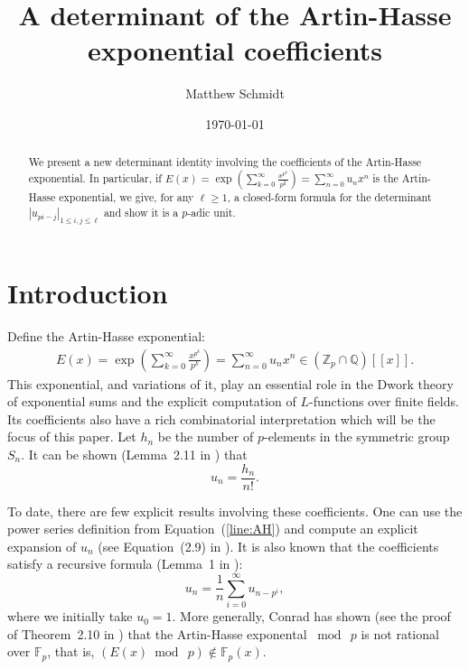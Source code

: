 \documentclass[letterpaper,oneside, 10pt]{amsart}
\theoremstyle{definition}
\numberwithin{equation}{section}
\newcommand{\Fp}{\mathbb{F}_p}
\newcommand{\Zp}{\mathbb{Z}_p}
\begin{document}
\date{\today}
\title{A determinant of the Artin-Hasse exponential coefficients}
\author{Matthew Schmidt}

\begin{abstract}
We present a new determinant identity involving the coefficients of the Artin-Hasse exponential. In particular, if $E(x) = \exp(\sum_{k=0}^\infty \frac{x^{p^k}}{p^k}) = \sum_{n=0}^\infty u_nx^n$ is the Artin-Hasse exponential, we give, for any $\ell\geq 1$, a closed-form formula for the determinant $|u_{pi-j}|_{1\leq i,j\leq \ell}$ and show it is a $p$-adic unit.
\end{abstract}

\maketitle 


\section{Introduction}

Define the Artin-Hasse exponential:
\begin{align}\label{line:AH}
	E(x) = \exp(\sum_{k=0}^\infty \frac{x^{p^k}}{p^k}) = \sum_{n=0}^\infty u_nx^n\in (\Zp\cap\mathbb{Q})[[x]].
\end{align}
This exponential, and variations of it, play an essential role in the Dwork theory of exponential sums and the explicit computation of $L$-functions over finite fields. Its coefficients also have a rich combinatorial interpretation which will be the focus of this paper. Let $h_n$ be the number of $p$-elements in the symmetric group $S_n$. It can be shown (Lemma~2.11 in \cite{Kracht}) that
\[
	u_n = \frac{h_n}{n!}. 
\]


To date, there are few explicit results involving these coefficients. 
One can use the power series definition from Equation~(\ref{line:AH}) and compute an explicit expansion of $u_n$ (see Equation~(2.9) in \cite{Kracht}).  It is also known that the coefficients satisfy a recursive formula (Lemma~1 in \cite{KS}):
\[
	u_n = \frac{1}{n}\sum_{i=0}^\infty u_{n-p^i},
\]
where we initially take $u_0=1$.  More generally,  Conrad has shown (see the proof of Theorem~2.10 in \cite{KConrad}) that the Artin-Hasse exponental $\bmod\ p$ is not rational over $\Fp$, that is,  $(E(x)\bmod\ p)\not\in \Fp(x)$.  
\end{document}
